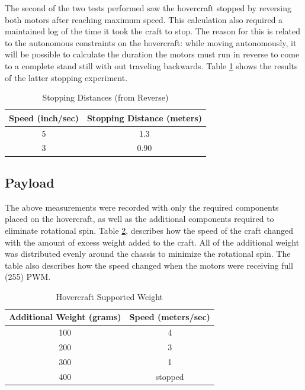 The second of the two tests performed saw the hovercraft stopped by reversing both motors after reaching maximum speed.  This calculation  also required a maintained log of the time it took the craft to stop. The reason for this is related to the autonomous constraints on the hovercraft: while moving autonomously, it will be possible to calculate the duration the motors must run in reverse to come to a complete stand still with out traveling backwards.  Table \ref{reverseTable} shows the results of the latter stopping experiment. 

\begin{table}
\caption{Stopping Distances (from Reverse)}
\begin{center}
\begin{tabular}{ c c }
  Speed (inch/sec) & Stopping Distance (meters) \\
  \hline
  5 & 1.3 \\
  3 & 0.90 \\
\end{tabular}
\end{center}
\label{reverseTable}
\end{table}

\subsection{Payload}
The above measurements were recorded with only the required components placed on the hovercraft, as well as the additional components required to eliminate rotational spin. Table \ref{weightTable}, describes how the speed of the craft changed with the amount of excess weight added to the craft. All of the additional weight was distributed evenly around the chassis to minimize the rotational spin. The table also describes how the speed changed when the motors were receiving full (255) PWM.
\begin{table}
\caption{Hovercraft Supported Weight}
\begin{center}
\begin{tabular}{ c c }
  Additional Weight (grams) & Speed (meters/sec) \\
  \hline
  100 & 4 \\
  200 & 3 \\
  300 & 1 \\
  400 & stopped \\
\end{tabular}
\end{center}
\label{weightTable}
\end{table}

